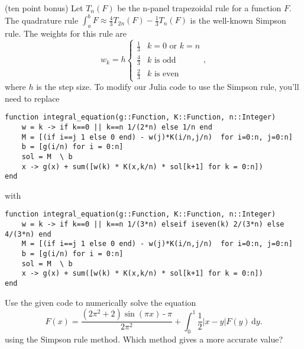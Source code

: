 \documentclass[12pt,fleqn]{exam}
\begin{document}
\begin{questions}
 
 \question (ten point bonus)   Let $T_n(F)$ be the n-panel trapezoidal rule for a function $F$.  The quadrature rule $\int_a^b F \approx
 \frac{4}{3} T_{2n}(F) - \frac{1}{3} T_n(F)$ is the well-known Simpson rule.  The weights for this rule are
 \begin{equation}
    w_k = h \begin{cases}   \frac{1}{3} & k = 0 \text{ or } k = n \\
                                              \frac{4}{3} & k \text{ is odd } \\
                                                      \frac{2}{3} & k \text{ is even }
\end{cases}, 
 \end{equation}
 where $h$ is the step size.  To modify our Julia code to use the Simpson rule, you'll need to replace
 \begin{verbatim}
function integral_equation(g::Function, K::Function, n::Integer)
    w = k -> if k==0 || k==n 1/(2*n) else 1/n end
    M = [(if i==j 1 else 0 end) - w(j)*K(i/n,j/n)  for i=0:n, j=0:n]
    b = [g(i/n) for i = 0:n]
    sol = M  \ b
    x -> g(x) + sum([w(k) * K(x,k/n) * sol[k+1] for k = 0:n])
end
\end{verbatim}
with 
\begin{verbatim}
function integral_equation(g::Function, K::Function, n::Integer)
    w = k -> if k==0 || k==n 1/(3*n) elseif iseven(k) 2/(3*n) else 4/(3*n) end
    M = [(if i==j 1 else 0 end) - w(j)*K(i/n,j/n)  for i=0:n, j=0:n]
    b = [g(i/n) for i = 0:n]
    sol = M  \ b
    x -> g(x) + sum([w(k) * K(x,k/n) * sol[k+1] for k = 0:n])
end
\end{verbatim}

Use the given code to numerically solve the equation
\begin{equation}
F(x) =  \frac{\left( 2 {{\ensuremath{\pi} }^{2}}\operatorname{+}2\right)  \sin{\left( \ensuremath{\pi}  x\right) }\operatorname{-}\ensuremath{\pi} }{2 {{\ensuremath{\pi} }^{2}}}  + \int_0^1 \frac{1}{2} |x - y| F(y) \, \mathrm{d} y.
\end{equation}
using the Simpson rule method.  Which method gives a more accurate value? 
 
 

\end{questions}
\end{document}
